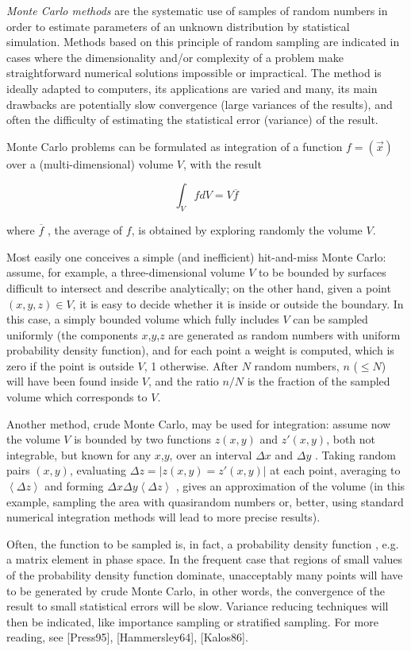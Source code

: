 \documentclass{article}
\begin{document}
\emph{Monte Carlo methods} are the systematic use of samples of random numbers in order to estimate parameters of an unknown distribution by statistical simulation. Methods based on this principle of random sampling are indicated in cases where the dimensionality and/or complexity of a problem make straightforward numerical solutions impossible or impractical. The method is ideally adapted to computers, its applications are varied and many, its main drawbacks are potentially slow convergence (large variances of the results), and often the difficulty of estimating the statistical error (variance) of the result.

Monte Carlo problems can be formulated as integration of a function $f=(\vec{x})$ over a (multi-dimensional) volume $V$, with the result

$$ \int_V f dV = V \overline{f} $$

where $\overline{f}$ , the average of $f$, is obtained by exploring randomly the volume $V$.

Most easily one conceives a simple (and inefficient) hit-and-miss Monte Carlo: assume, for example, a three-dimensional volume $V$ to be bounded by surfaces difficult to intersect and describe analytically; on the other hand, given a point $(x,y,z)\in V$, it is easy to decide whether it is inside or outside the boundary. In this case, a simply bounded volume which fully includes $V$ can be sampled uniformly (the components $x$,$y$,$z$ are generated as random numbers with uniform probability density function), and for each point a weight is computed, which is zero if the point is outside $V$, 1 otherwise. After $N$ random numbers, $n$ ($\le N$) will have been found inside $V$, and the ratio $n/N$ is the fraction of the sampled volume which corresponds to $V$.

Another method, crude Monte Carlo, may be used for integration: assume now the volume $V$ is bounded by two functions $z(x,y)$ and $z'(x,y)$, both not integrable, but known for any $x$,$y$, over an interval $\Delta x$ and $\Delta y$ . Taking random pairs $(x,y)$, evaluating $\Delta z = | z(x,y)=z'(x,y)|$ at each point, averaging to $\left<\Delta z\right>$ and forming $\Delta x \Delta y \left<\Delta z\right>$ , gives an approximation of the volume (in this example, sampling the area with quasirandom numbers or, better, using standard numerical integration methods will lead to more precise results).

Often, the function to be sampled is, in fact, a probability density function , e.g. a matrix element in phase space. In the frequent case that regions of small values of the probability density function dominate, unacceptably many points will have to be generated by crude Monte Carlo, in other words, the convergence of the result to small statistical errors will be slow. Variance reducing techniques will then be indicated, like importance sampling or stratified sampling. For more reading, see [Press95], [Hammersley64], [Kalos86].
\end{document}
